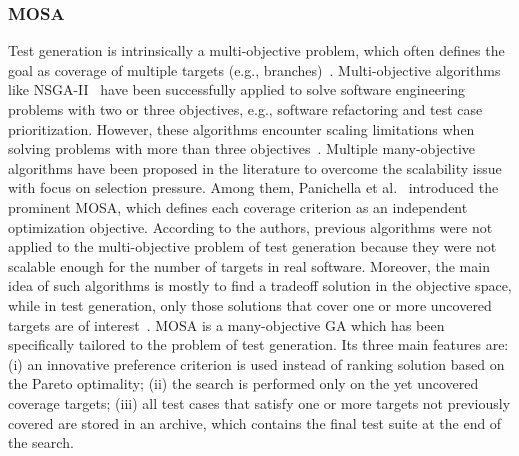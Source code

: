 \documentclass[paper=a4,%
  twoside,%
  BCOR4mm,%
  abstract=true,%
  toc=bibliography,%
  chapterprefix=true,%
  toc=bibliographynumbered,%
  open=right,%
  english,%
  pagesize=pdftex]{scrreprt}
\begin{document}

\subsubsection{MOSA}
Test generation is intrinsically a multi-objective problem, which often defines the goal as coverage of multiple targets (e.g., branches)~\cite{Panichella2018}. Multi-objective algorithms like \ac{NSGA-II}~\cite{Deb_2000} have been successfully applied to solve software engineering problems with two or three objectives, e.g., software refactoring and test case prioritization. However, these algorithms encounter scaling limitations when solving problems with more than three objectives~\cite{Li2015}. Multiple many-objective algorithms have been proposed in the literature to overcome the scalability issue with focus on selection pressure. Among them, Panichella et al.~\cite{Panichella_2015} introduced the prominent \ac{MOSA}, which defines each coverage criterion as an independent optimization objective. According to the authors, previous algorithms were not applied to the multi-objective problem of test generation because they were not scalable enough for the number of targets in real software. Moreover, the main idea of such algorithms is mostly to find a tradeoff solution in the objective space, while in test generation, only those solutions that cover one or more uncovered targets are of interest~\cite{Panichella2018}. \ac{MOSA} is a many-objective \ac{GA} which has been specifically tailored to the problem of test generation. Its three main features are: (i) an innovative preference criterion is used instead of ranking solution based on the Pareto optimality; (ii) the search is performed only on the yet uncovered coverage targets; (iii) all test cases that satisfy one or more targets not previously covered are stored in an archive, which contains the final test suite at the end of the search. 
\end{document}
